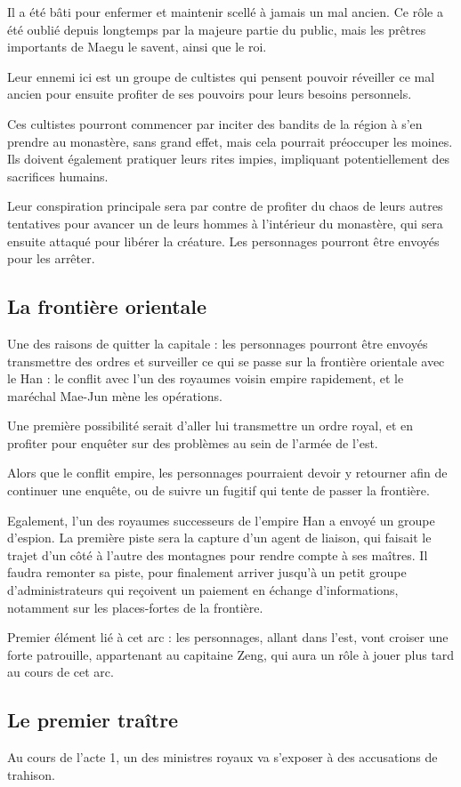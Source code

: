 \documentclass[10pt,a4paper]{book}
\begin{document}
Il a été bâti pour enfermer et maintenir scellé à jamais un mal ancien. Ce rôle a été oublié depuis longtemps par la majeure partie du public, mais les prêtres importants de Maegu le savent, ainsi que le roi. 

Leur ennemi ici est un groupe de cultistes qui pensent pouvoir réveiller ce mal ancien pour ensuite profiter de ses pouvoirs pour leurs besoins personnels.

Ces cultistes pourront commencer par inciter des bandits de la région à s'en prendre au monastère, sans grand effet, mais cela pourrait préoccuper les moines. Ils doivent également pratiquer leurs rites impies, impliquant potentiellement des sacrifices humains.

Leur conspiration principale sera par contre de profiter du chaos de leurs autres tentatives pour avancer un de leurs hommes à l'intérieur du monastère, qui sera ensuite attaqué pour libérer la créature. Les personnages pourront être envoyés pour les arrêter.
\subsection{La frontière orientale}
Une des raisons de quitter la capitale : les personnages pourront être envoyés transmettre des ordres et surveiller ce qui se passe sur la frontière orientale avec le Han : le conflit avec l'un des royaumes voisin empire rapidement, et le maréchal Mae-Jun mène les opérations.

Une première possibilité serait d'aller lui transmettre un ordre royal, et en profiter pour enquêter sur des problèmes au sein de l'armée de l'est.

Alors que le conflit empire, les personnages pourraient devoir y retourner afin de continuer une enquête, ou de suivre un fugitif qui tente de passer la frontière.

Egalement, l'un des royaumes successeurs de l'empire Han a envoyé un groupe d'espion. La première piste sera la capture d'un agent de liaison, qui faisait le trajet d'un côté à l'autre des montagnes pour rendre compte à ses maîtres. Il faudra remonter sa piste, pour finalement arriver jusqu'à un petit groupe d'administrateurs qui reçoivent un paiement en échange d'informations, notamment sur les places-fortes de la frontière.

Premier élément lié à cet arc : les personnages, allant dans l'est, vont croiser une forte patrouille, appartenant au capitaine Zeng, qui aura un rôle à jouer plus tard au cours de cet arc.
\subsection{Le premier traître}
Au cours de l'acte 1, un des ministres royaux va s'exposer à des accusations de trahison. 
\end{document}
